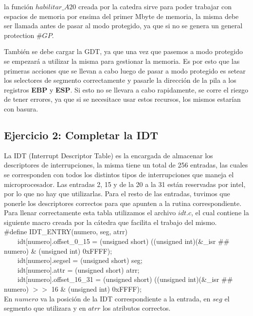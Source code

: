 \documentclass[a4paper,10pt,twoside]{article}
\begin{document}
la función $habilitar\_A20$ creada por la catedra sirve para poder trabajar con espacios de memoria por ensima del primer Mbyte de memoria, la misma debe ser llamada antes de pasar al modo protegido, ya que si no se genera un general protection $\#GP$.

También se debe cargar la GDT, ya que una vez que pasemos a modo protegido se empezará a utilizar la misma para gestionar la memoria. Es por esto que las primeras acciones que se llevan a cabo luego de pasar a modo protegido es setear los selectores de segmento correctamente y pasarle la dirección de la pila a los registros \textbf{EBP} y \textbf{ESP}. Si esto no se llevara a cabo rapidamente, se corre el riezgo de tener errores, ya que si se necesitace usar estos recursos, los mismos estarían con basura.

\subsection{Ejercicio 2: Completar la IDT}
La IDT (Interrupt Descriptor Table) es la encargada de almacenar los descriptores de interrupciones, la misma tiene un total de 256 entradas, las cuales se corresponden con todos los distintos tipos de interrupciones que maneja el microprocesador. Las entradas 2, 15 y de la 20 a la 31 están reservadas por intel, por lo que no hay que utilizarlas. Para el resto de las entradas, tuvimos que ponerle los descriptores correctos para que apunten a la rutina correspondiente.
Para llenar correctamente esta tabla utilizamos el archivo $idt.c$, el cual contiene la siguiente macro creada por la cátedra que facilita el trabajo del mismo.\\

\#define IDT\_ENTRY(numero, seg, atrr) \\                                                                      
\ \ \ \ idt[numero].offset\_0\_15 = (unsigned short) ((unsigned int)(\&\_isr \#\# numero) \& (unsigned int) 0xFFFF); \\
\ \ \ \ idt[numero].segsel = (unsigned short) seg; \\
\ \ \ \ idt[numero].attr = (unsigned short) atrr; \\
\ \ \ \ idt[numero].offset\_16\_31 = (unsigned short) ((unsigned int)(\&\_isr \#\# numero) $>>$ 16 \& (unsigned int) 0xFFFF); \\

En $numero$ va la posición de la IDT correspondiente a la entrada, en $seg$ el segmento que utilizara y en $atrr$ los atributos correctos.
\end{document}
